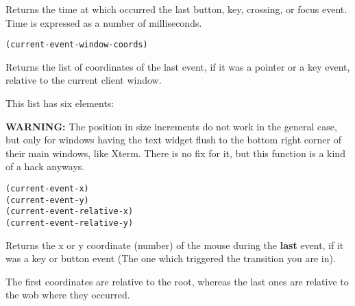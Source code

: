 Returns the time at which occurred the last button, key, crossing, or focus 
event. Time is expressed as a number of milliseconds.

        
{\usagefont\begin{verbatim}
(current-event-window-coords)
\end{verbatim}}\usageupspace

Returns the list of coordinates of the last event, if it was a
pointer or a key event, relative to the current client window.

This list has six elements:

{\bf WARNING:} The position in size increments do not work in the general
case, but only for windows having the text widget flush to the bottom right
corner of their main windows, like Xterm. There is no fix for it, but this
function is a kind of a hack anyways.

        
{\usagefont\begin{verbatim}
(current-event-x)
(current-event-y)
(current-event-relative-x)
(current-event-relative-y)
\end{verbatim}}\usageupspace

Returns the x or y coordinate (number)  of the mouse during the {\bf last}
event, if it was a key or button event (The one which triggered the
transition you are in).

The first coordinates are relative to the root, whereas the last ones are
relative to the wob where they occurred.

        
